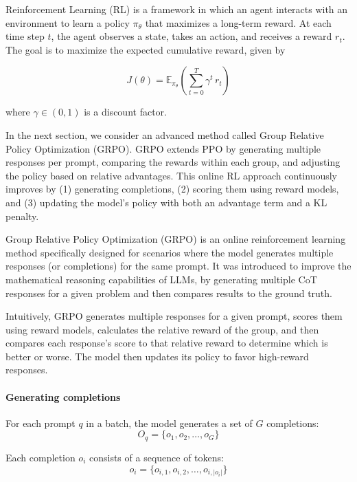 Reinforcement Learning (RL) is a framework in which an agent interacts with an environment to learn a policy $\pi_\theta$ that maximizes a long-term reward. At each time step $t$, the agent observes a state, takes an action, and receives a reward $r_t$. The goal is to maximize the expected cumulative reward, given by

\begin{equation}
J(\theta) = \mathbb{E}_{\pi_\theta}\left( \sum_{t=0}^{T} \gamma^t\,r_t\right)
\end{equation}

where $\gamma\in(0,1)$ is a discount factor.

In the next section, we consider an advanced method called Group Relative Policy Optimization (GRPO). GRPO extends PPO by generating multiple responses per prompt, comparing the rewards within each group, and adjusting the policy based on relative advantages. This online RL approach continuously improves by (1) generating completions, (2) scoring them using reward models, and (3) updating the model's policy with both an advantage term and a KL penalty.

 \label{app:grpo}

Group Relative Policy Optimization (GRPO) \citet{DeepSeek-AIDEEPSEEKR12025} is an online reinforcement learning method specifically designed for scenarios where the model generates multiple responses (or completions) for the same prompt. It was introduced to improve the mathematical reasoning capabilities of LLMs, by generating multiple CoT responses for a given problem and then compares results to the ground truth.

Intuitively, GRPO generates multiple responses for a given prompt, scores them using reward models, calculates the relative reward of the group, and then compares each response's score to that relative reward to determine which is better or worse. The model then updates its policy to favor high-reward responses.

\paragraph{Generating completions} For each prompt $q$ in a batch, the model generates a set of $G$ completions:
\begin{equation}
O_q = \{o_1, o_2, \ldots, o_G\}
\end{equation}

Each completion $o_i$ consists of a sequence of tokens:
\begin{equation}
o_i = \{o_{i,1}, o_{i,2}, \ldots, o_{i,|o_i|}\}
\end{equation}

